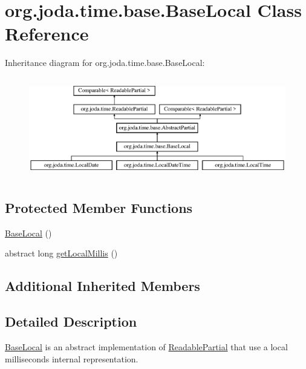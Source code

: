 \hypertarget{classorg_1_1joda_1_1time_1_1base_1_1_base_local}{\section{org.\-joda.\-time.\-base.\-Base\-Local Class Reference}
\label{classorg_1_1joda_1_1time_1_1base_1_1_base_local}
}
Inheritance diagram for org.\-joda.\-time.\-base.\-Base\-Local\-:\begin{figure}[H]
\begin{center}
\leavevmode
\includegraphics[height=4.423381cm]{classorg_1_1joda_1_1time_1_1base_1_1_base_local}
\end{center}
\end{figure}
\subsection*{Protected Member Functions}
\begin{DoxyCompactItemize}
\item 
\hyperlink{classorg_1_1joda_1_1time_1_1base_1_1_base_local_acb8c2326bb570cdc3ffbc58db2fbf1a1}{Base\-Local} ()
\item 
abstract long \hyperlink{classorg_1_1joda_1_1time_1_1base_1_1_base_local_a4efc237dbc03edd2ba570cfc6be7e409}{get\-Local\-Millis} ()
\end{DoxyCompactItemize}
\subsection*{Additional Inherited Members}


\subsection{Detailed Description}
\hyperlink{classorg_1_1joda_1_1time_1_1base_1_1_base_local}{Base\-Local} is an abstract implementation of \hyperlink{interfaceorg_1_1joda_1_1time_1_1_readable_partial}{Readable\-Partial} that use a local milliseconds internal representation. 


